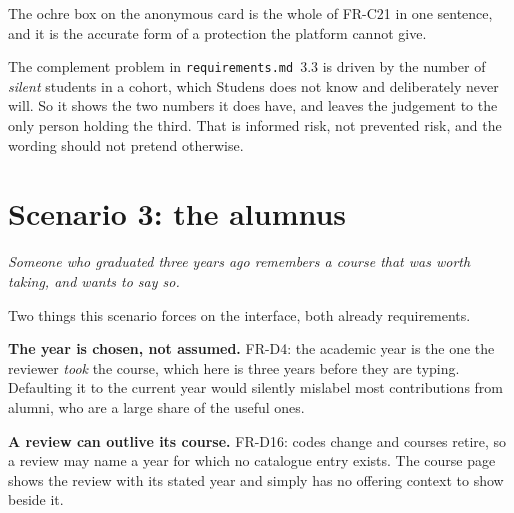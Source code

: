 \documentclass[11pt,a4paper]{article}
\begin{document}
\begin{careful}
The ochre box on the anonymous card is the whole of FR-C21 in one sentence, and
it is the accurate form of a protection the platform cannot give.

The complement problem in \texttt{requirements.md}~3.3 is driven by the number
of \emph{silent} students in a cohort, which Studens does not know and
deliberately never will. So it shows the two numbers it does have, and leaves
the judgement to the only person holding the third. That is informed risk, not
prevented risk, and the wording should not pretend otherwise.
\end{careful}


\newpage
\section{Scenario 3: the alumnus}

\textit{Someone who graduated three years ago remembers a course that was worth
taking, and wants to say so.}

\begin{center}
\end{center}

Two things this scenario forces on the interface, both already requirements.

\textbf{The year is chosen, not assumed.} FR-D4: the academic year is the one
the reviewer \emph{took} the course, which here is three years before they are
typing. Defaulting it to the current year would silently mislabel most
contributions from alumni, who are a large share of the useful ones.

\textbf{A review can outlive its course.} FR-D16: codes change and courses
retire, so a review may name a year for which no catalogue entry exists. The
course page shows the review with its stated year and simply has no offering
context to show beside it.
\end{document}
